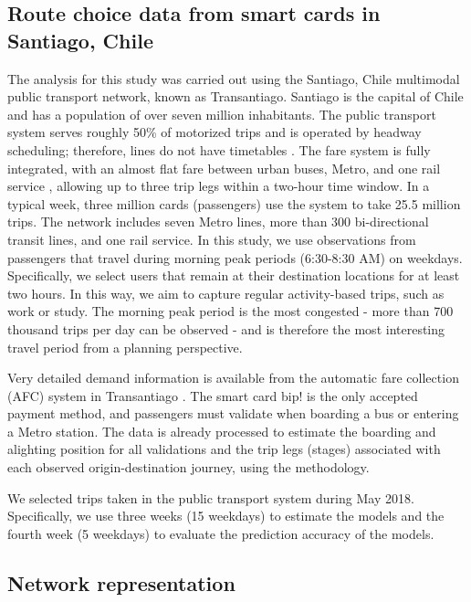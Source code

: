 \documentclass[12pt,a4paper]{article}
\begin{document}
\subsection{Route choice data from smart cards in Santiago, Chile}

The analysis for this study was carried out using the Santiago, Chile multimodal public transport network, known as Transantiago. Santiago is the capital of Chile and has a population of over seven million inhabitants. The public transport system serves roughly 50\% of motorized trips and is operated by headway scheduling; therefore, lines do not have timetables . The fare system is fully integrated, with an almost flat fare between urban buses, Metro, and one rail service , allowing up to three trip legs within a two-hour time window. In a typical week, three million cards (passengers) use the system to take 25.5 million trips. The network includes seven Metro lines, more than 300 bi-directional transit lines, and one rail service. In this study, we use observations from passengers that travel during morning peak periods (6:30-8:30 AM) on weekdays. Specifically, we select users that remain at their destination locations for at least two hours. In this way, we aim to capture regular activity-based trips, such as work or study. The morning peak period is the most congested - more than 700 thousand trips per day can be observed - and is therefore the most interesting travel period from a planning perspective.

Very detailed demand information is available from the automatic fare collection (AFC) system in Transantiago \citep{gschwender2016using}. The smart card bip! is the only accepted payment method, and passengers must validate when boarding a bus or entering a Metro station. The data is already processed to estimate the boarding and alighting position for all validations and the trip legs (stages) associated with each observed origin-destination journey, using the \cite{munizaga2012estimation} methodology. 

We selected trips taken in the public transport system during May 2018. Specifically, we use three weeks (15 weekdays) to estimate the models and the fourth week (5 weekdays) to evaluate the prediction accuracy of the models. 

\subsection{Network representation}
\end{document}
